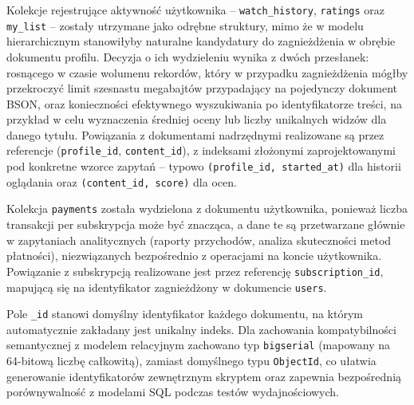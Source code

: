 Kolekcje rejestrujące aktywność użytkownika -- \texttt{watch\_history},
\texttt{ratings} oraz \texttt{my\_list} -- zostały utrzymane jako odrębne
struktury, mimo że w modelu hierarchicznym stanowiłyby naturalne kandydatury
do zagnieżdżenia w obrębie dokumentu profilu. Decyzja o ich wydzieleniu
wynika z dwóch przesłanek: rosnącego w czasie wolumenu rekordów, który
w przypadku zagnieżdżenia mógłby przekroczyć limit szesnastu megabajtów
przypadający na pojedynczy dokument BSON, oraz konieczności efektywnego
wyszukiwania po identyfikatorze treści, na przykład w celu wyznaczenia
średniej oceny lub liczby unikalnych widzów dla danego tytułu. Powiązania
z dokumentami nadrzędnymi realizowane są przez referencje
(\texttt{profile\_id}, \texttt{content\_id}), z indeksami złożonymi
zaprojektowanymi pod konkretne wzorce zapytań -- typowo
\texttt{(profile\_id, started\_at)} dla historii oglądania oraz
\texttt{(content\_id, score)} dla ocen.

Kolekcja \texttt{payments} została wydzielona z dokumentu użytkownika,
ponieważ liczba transakcji per subskrypcja może być znacząca, a dane te
są przetwarzane głównie w zapytaniach analitycznych (raporty przychodów,
analiza skuteczności metod płatności), niezwiązanych bezpośrednio
z operacjami na koncie użytkownika. Powiązanie z subskrypcją realizowane
jest przez referencję \texttt{subscription\_id}, mapującą się na identyfikator
zagnieżdżony w dokumencie \texttt{users}.

Pole \texttt{\_id} stanowi domyślny identyfikator każdego dokumentu, na
którym automatycznie zakładany jest unikalny indeks. Dla zachowania
kompatybilności semantycznej z modelem relacyjnym zachowano typ
\texttt{bigserial} (mapowany na 64-bitową liczbę całkowitą), zamiast
domyślnego typu \texttt{ObjectId}, co ułatwia generowanie identyfikatorów
zewnętrznym skryptem oraz zapewnia bezpośrednią porównywalność z modelami
SQL podczas testów wydajnościowych.
